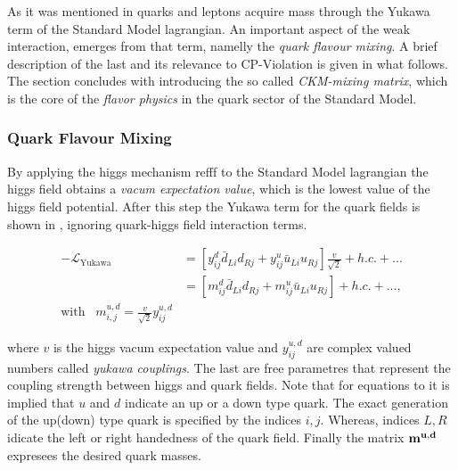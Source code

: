 As it was mentioned in  quarks and leptons acquire mass through the Yukawa term
of the Standard Model lagrangian. An important aspect of the weak interaction, emerges from that term,
namelly the {\it quark flavour mixing}. A brief description of the last and its relevance to CP-Violation is given in what follows.
The section concludes with introducing the so called {\it CKM-mixing matrix}, which is the core of the
{\it flavor physics} in the quark sector of the Standard Model.

\subsubsection{Quark Flavour Mixing}
By applying the higgs mechanism {\color{red} refff} to the Standard Model lagrangian the higgs field obtains a
{\it vacum expectation value}, which is the lowest value of the higgs field potential.
After this step the Yukawa term for the quark fields is shown in ,
 ignoring quark-higgs field interaction terms.

\begin{subequations}
\label{yukawa_flavour}
  \begin{align}
  -\mathscr{L}_{\text{Yukawa}} &= \left[ y_{ij}^d \bar{d}_{Li} d_{Rj} + y_{ij}^u \bar{u}_{Li} u_{Rj} \right] \frac{v}{\sqrt{2}} + h.c. + ...  \\
                               &= \left[ m_{ij}^d \bar{d}_{Li} d_{Rj} + m_{ij}^u \bar{u}_{Li} u_{Rj} \right] + h.c. + ...,  \\
                               \text{with} \;\;\; m^{u,d}_{i,j} = \frac{v}{\sqrt{2}} y_{ij}^{u,d} & \nonumber
  \end{align}
\end{subequations}

\noindent where $v$ is the higgs vacum expectation value and $y_{ij}^{u,d}$ are complex valued numbers called {\it yukawa couplings}.
The last are free parametres that represent the coupling strength between higgs and quark fields.
Note that for equations  to  it is implied that $u$ and $d$ indicate
an up or a down type quark. The exact generation of the up(down) type quark is specified by the indices $i,j$.
Whereas, indices $L,R\;$ idicate the left or right handedness of the quark field.
Finally the matrix $\bf m^{u,d}$ expresees the desired quark masses.


